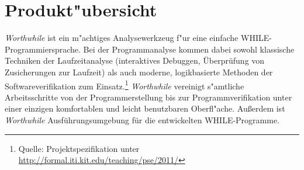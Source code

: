 \section{Produkt"ubersicht}%

\textit{Worthwhile} ist ein m"achtiges Analysewerkzeug f"ur eine einfache WHILE-Programmiersprache. Bei der Programmanalyse kommen dabei sowohl klassische Techniken der Laufzeitanalyse (interaktives Debuggen, Überprüfung von Zusicherungen zur Laufzeit) als auch moderne, logikbasierte Methoden der Softwareverifikation zum Einsatz.\footnote{Quelle: Projektspezifikation unter \url{http://formal.iti.kit.edu/teaching/pse/2011/}} \textit{Worthwhile} vereinigt s"amtliche Arbeitsschritte von der Programmerstellung bis zur Programmverifikation unter einer einzigen komfortablen und leicht benutzbaren Oberfl"ache. Außerdem ist \textit{Worthwhile} Ausführungsumgebung für die entwickelten WHILE-Programme.%
